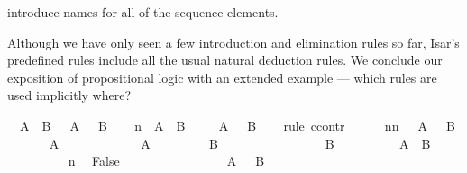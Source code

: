 \begin{isabellebody}
\begin{isamarkuptext}
introduce names for all of the sequence elements.%
\end{isamarkuptext}%
\isamarkuptrue%
%
\begin{isamarkuptext}%
Although we have only seen a few introduction and elimination rules so
far, Isar's predefined rules include all the usual natural deduction
rules. We conclude our exposition of propositional logic with an extended
example --- which rules are used implicitly where?%
\end{isamarkuptext}%
\isamarkuptrue%
\ {\isachardoublequote}{\isasymnot}\ {\isacharparenleft}A\ {\isasymand}\ B{\isacharparenright}\ {\isasymlongrightarrow}\ {\isasymnot}\ A\ {\isasymor}\ {\isasymnot}\ B{\isachardoublequote}\isanewline
\isamarkupfalse%
\isanewline
\ \ \isamarkupfalse%
\ n{\isacharcolon}\ {\isachardoublequote}{\isasymnot}\ {\isacharparenleft}A\ {\isasymand}\ B{\isacharparenright}{\isachardoublequote}\isanewline
\ \ \isamarkupfalse%
\ {\isachardoublequote}{\isasymnot}\ A\ {\isasymor}\ {\isasymnot}\ B{\isachardoublequote}\isanewline
\ \ \isamarkupfalse%
\ {\isacharparenleft}rule\ ccontr{\isacharparenright}\isanewline
\ \ \ \ \isamarkupfalse%
\ nn{\isacharcolon}\ {\isachardoublequote}{\isasymnot}\ {\isacharparenleft}{\isasymnot}\ A\ {\isasymor}\ {\isasymnot}\ B{\isacharparenright}{\isachardoublequote}\isanewline
\ \ \ \ \isamarkupfalse%
\ {\isachardoublequote}{\isasymnot}\ A{\isachardoublequote}\isanewline
\ \ \ \ \isamarkupfalse%
\isanewline
\ \ \ \ \ \ \isamarkupfalse%
\ {\isachardoublequote}A{\isachardoublequote}\isanewline
\ \ \ \ \ \ \isamarkupfalse%
\ {\isachardoublequote}{\isasymnot}\ B{\isachardoublequote}\isanewline
\ \ \ \ \ \ \isamarkupfalse%
\isanewline
\ \ \ \ \ \ \ \ \isamarkupfalse%
\ {\isachardoublequote}B{\isachardoublequote}\isanewline
\ \ \ \ \ \ \ \ \isamarkupfalse%
\ {\isachardoublequote}A\ {\isasymand}\ B{\isachardoublequote}\ \isamarkupfalse%
\isacommand{{\isachardot}{\isachardot}}\isanewline
\ \ \ \ \ \ \ \ \isamarkupfalse%
\ n\ \isamarkupfalse%
\ False\ \isamarkupfalse%
\isacommand{{\isachardot}{\isachardot}}\isanewline
\ \ \ \ \ \ \isamarkupfalse%
\isanewline
\ \ \ \ \ \ \isamarkupfalse%
\ {\isachardoublequote}{\isasymnot}\ A\ {\isasymor}\ {\isasymnot}\ B{\isachardoublequote}\ \isamarkupfalse%
\isacommand{{\isachardot}{\isachardot}}\isanewline

\end{isabellebody}
